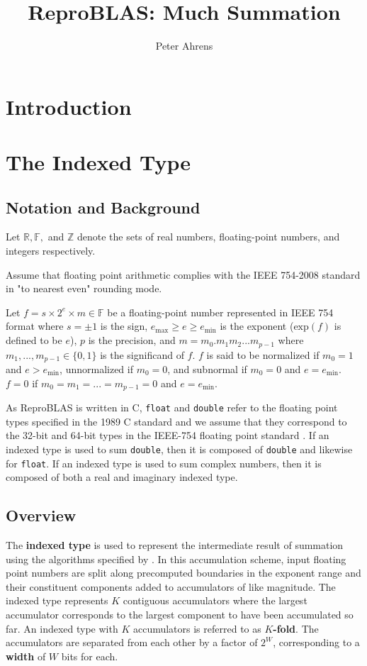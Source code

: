 \documentclass[12pt]{article}
\author{Peter Ahrens}
\title{ReproBLAS: Much Summation}
\providecommand{\R}{\ensuremath{\mathbb{R}}}
\providecommand{\F}{\ensuremath{\mathbb{F}}}
\providecommand{\Z}{\ensuremath{\mathbb{Z}}}
\providecommand{\exp}{\ensuremath{\text{exp}}}
\providecommand{\min}{\ensuremath{\text{min}}}
\providecommand{\max}{\ensuremath{\text{max}}}
\begin{document}
\noindent
\maketitle
\newpage
\section{Introduction}
\section{The Indexed Type}
  \subsection{Notation and Background}
    Let $\R, \F, $ and $\Z$ denote the sets of real numbers, floating-point numbers, and integers respectively.

    Assume that floating point arithmetic complies with the IEEE 754-2008 standard in "to nearest even" rounding mode.

    Let $f = s \times 2^e \times m \in \F$ be a floating-point number represented in IEEE 754 format where $s = \pm 1$ is the sign, $e_{\max} \geq e \geq e_{\min}$ is the exponent ($\exp(f)$ is defined to be $e$), $p$ is the precision, and $m = m_0.m_1m_2...m_{p-1}$ where $m_1, ..., m_{p - 1} \in \{0, 1\}$ is the significand of $f$. $f$ is said to be normalized if $m_0 = 1$ and $e > e_{\min}$, unnormalized if $m_0 = 0$, and subnormal if $m_0 = 0$ and $e = e_{\min}$. $f = 0$ if $m_0 = m_1 = ... = m_{p - 1} = 0$ and $e = e_{\min}$.

    As ReproBLAS is written in C, \verb|float| and \verb|double| refer to the floating point types specified in the 1989 C standard \cite{c89} and we assume that they correspond to the 32-bit and 64-bit types in the IEEE-754 floating point standard \cite{ieee754}. If an indexed type is used to sum \verb|double|, then it is composed of \verb|double| and likewise for \verb|float|. If an indexed type is used to sum complex numbers, then it is composed of both a real and imaginary indexed type.
  \subsection{Overview}
    The \textbf{indexed type} is used to represent the intermediate result of summation using the algorithms specified by \cite{parallelreproduciblesummation}. In this accumulation scheme, input floating point numbers are split along precomputed boundaries in the exponent range and their constituent components added to accumulators of like magnitude. The indexed type represents $K$ contiguous accumulators where the largest accumulator corresponds to the largest component to have been accumulated so far. An indexed type with $K$ accumulators is referred to as \textbf{$K$-fold}. The accumulators are separated from each other by a factor of $2^W$, corresponding to a \textbf{width} of $W$ bits for each.
\end{document}
